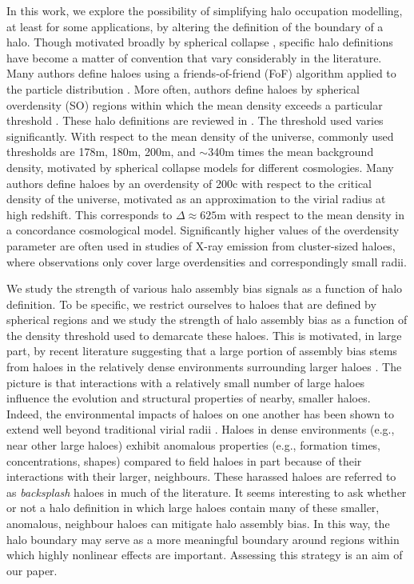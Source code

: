 \documentclass[usenatbib,fleqn]{mnras}
\begin{document}
In this work, we explore the possibility of simplifying halo occupation modelling, at least for some applications, by altering the definition of the boundary of a halo. Though motivated broadly by spherical collapse \citep{gunn_gott72, fillmore_goldreich84, ryden_gunn87, lacey_cole93, eke_etal96, mota_vandebruck04, pace_etal10}, specific halo definitions have become a matter of convention that vary considerably in the literature. Many authors define haloes using a friends-of-friend (FoF) algorithm applied to the particle distribution \citep[e.g., ][]{davis_etal85}. More often, authors define haloes by spherical overdensity (SO) regions within which the mean density exceeds a particular threshold \citep[e.g., ][]{lacey_cole93}. These halo definitions are reviewed in \citet[][and references therein]{knebe_etal11}. The threshold used varies significantly. With respect to the mean density of the universe, commonly used thresholds are 178m, 180m, 200m, and $\sim$340m times the mean background density, motivated by spherical collapse models for different cosmologies. Many authors define haloes by an overdensity of 200c with respect to the critical density of the universe, motivated as an approximation to the virial radius at high redshift. This corresponds to $\Delta \approx 625$m with respect to the mean density in a concordance cosmological model. Significantly higher values of the overdensity parameter are often used in studies of X-ray emission from cluster-sized haloes, where observations only cover large overdensities and correspondingly small radii.

We study the strength of various halo assembly bias signals as a function of halo definition. To be specific, we restrict ourselves to haloes that are defined by spherical regions and we study the strength of halo assembly bias as a function of the density threshold used to demarcate these haloes. This is motivated, in large part, by recent literature suggesting that a large portion of assembly bias stems from haloes in the relatively dense environments surrounding larger haloes \citep{wang_etal07,warnick_etal08,more_etal15,sunayama_etal16}. The picture is that interactions with a relatively small number of large haloes influence the evolution and structural properties of nearby, smaller haloes. Indeed, the environmental impacts of haloes on one another has been shown to extend well beyond traditional virial radii \citep{wetzel_etal14, diemer_kravtsov14, behroozi_etal13b, adhikari_etal14, wetzel_nagai15, more_etal15, hearin_etal16}. Haloes in dense environments (e.g., near other large haloes) exhibit anomalous properties (e.g., formation times, concentrations, shapes) compared to field haloes in part because of their interactions with their larger, neighbours. These harassed haloes are referred to as {\em backsplash} haloes in much of the literature. It seems interesting to ask whether or not a halo definition in which large haloes contain many of these smaller, anomalous, neighbour haloes can mitigate halo assembly bias. In this way, the halo boundary may serve as a more meaningful boundary around regions within which highly nonlinear effects are important. Assessing this strategy is an aim of our paper. 
\end{document}
